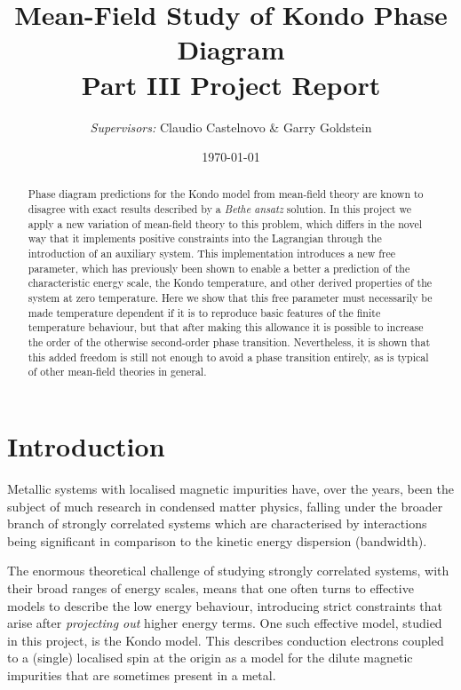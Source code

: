 \documentclass[12pt]{article}
\begin{document}


\title{
  Mean-Field Study of Kondo Phase Diagram \\
  \large Part III Project Report
}
\author{\textit{Supervisors:} Claudio Castelnovo \& Garry Goldstein}
\date{\today}


\maketitle

\begin{abstract}
Phase diagram predictions for the Kondo model from mean-field theory are known to disagree with exact results described by a \emph{Bethe ansatz} solution. In this project we apply a new variation of mean-field theory to this problem, which differs in the novel way that it implements positive constraints into the Lagrangian through the introduction of an auxiliary system. This implementation introduces a new free parameter, which has previously been shown to enable a better a prediction of the characteristic energy scale, the Kondo temperature, and other derived properties of the system at zero temperature. Here we show that this free parameter must necessarily be made temperature dependent if it is to reproduce basic features of the finite temperature behaviour, but that after making this allowance it is possible to increase the order of the otherwise second-order phase transition. Nevertheless, it is shown that this added freedom is still not enough to avoid a phase transition entirely, as is typical of other mean-field theories in general.
\end{abstract}

\section{Introduction}

Metallic systems with localised magnetic impurities have, over the years, been the subject of much research in condensed matter physics, falling under the broader branch of strongly correlated systems which are characterised by interactions being significant in comparison to the kinetic energy dispersion (bandwidth).

The enormous theoretical challenge of studying strongly correlated systems, with their broad ranges of energy scales, means that one often turns to effective models to describe the low energy behaviour, introducing strict constraints that arise after \textit{projecting out} higher energy terms. One such effective model, studied in this project, is the Kondo model. This describes conduction electrons coupled to a (single) localised spin at the origin as a model for the dilute magnetic impurities that are sometimes present in a metal.
\end{document}
